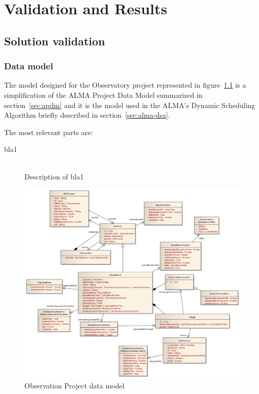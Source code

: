 \part{Validation and Results}

\chapter{Solution validation}

\section {Data model}

The model designed for the Observatory project represented in figure~\ref{fig:datamodel-obsproject} is a simplification of the ALMA Project Data Model summarized in section~\ref{sec:apdm} and it is the model used in the ALMA's Dynamic Scheduling Algorithm briefly described in section~\ref{sec:alma-dsa}.

The most relevant parts are: 
\begin{description}
\item[bla1] \hfill \\
Description of bla1
\end{description}

\begin{figure}[]	
\begin{center}
\includegraphics[width=1.15\textwidth]{images/ObsProject}
\caption{Observation Project data model}
\end{center}
\label{fig:datamodel-obsproject}
\end{figure}

